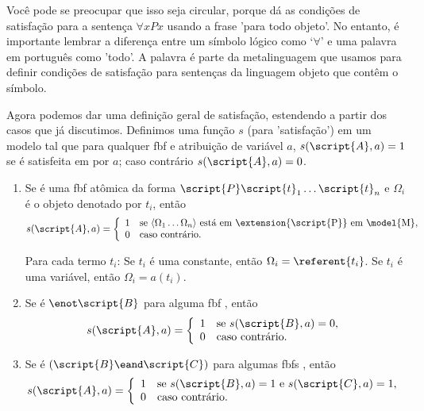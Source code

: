 Você pode se preocupar que isso seja circular, porque dá as condições de satisfação para a sentença $\forall x Px$ usando a frase 'para todo objeto'. No entanto, é importante lembrar a diferença entre um símbolo lógico como `$\forall$' e uma palavra em português como 'todo'. A palavra é parte da metalinguagem que usamos para definir condições de satisfação para sentenças da linguagem objeto que contêm o símbolo.

Agora podemos dar uma definição geral de satisfação, estendendo a partir dos casos que já discutimos. Definimos uma função $s$ (para 'satisfação') em um modelo  tal que para qualquer fbf  e atribuição de variável $a$, $s(\script{A}, a)=1$ se  é satisfeita em  por $a$; caso contrário $s(\script{A}, a)=0$.

\begin{enumerate}
\item Se  é uma fbf atômica da forma $\script{P}\script{t}_1\ldots\script{t}_n$ e $\Omega_i$ é o objeto denotado por $t_i$, então
\begin{displaymath}s(\script{A}, a) =
	\left\{\begin{array}{ll}
	1 & \mbox{se ${\langle}\Omega_1\ldots\Omega_n{\rangle}$ está em \extension{\script{P}} em \model{M}},\\
	0 & \mbox{caso contrário.}
	\end{array}\right.
\end{displaymath}

Para cada termo $t_i$: Se $t_i$ é uma constante, então $\Omega_i = \referent{t_i}$. Se $t_i$ é uma variável, então $\Omega_i = a(t_i)$.

\item Se  é ${\enot}\script{B}$ para alguma fbf , então
\begin{displaymath}s(\script{A}, a) =
	\left\{\begin{array}{ll}
	1 & \mbox{se $s(\script{B}, a) = 0$},\\
	0 & \mbox{caso contrário.}
	\end{array}\right.
\end{displaymath}

\item Se  é $(\script{B}\eand\script{C})$ para algumas fbfs , então
\begin{displaymath}s(\script{A}, a) =
	\left\{\begin{array}{ll}
	1 & \mbox{se $s(\script{B}, a) = 1$ e $s(\script{C}, a) = 1$,}\\
	0 & \mbox{caso contrário.}
	\end{array}\right.
\end{displaymath}


\end{enumerate}
